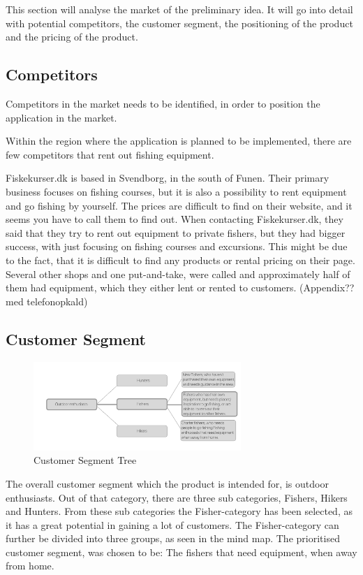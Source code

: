 This section will analyse the market of the preliminary idea. It will go into detail with potential competitors, the customer segment, the positioning of the product and the pricing of the product.

\subsection{Competitors}
Competitors in the market needs to be identified, in order to position the application in the market.

Within the region where the application is planned to be implemented, there are few competitors that rent out fishing equipment. 

Fiskekurser.dk is based in Svendborg, in the south of Funen. Their primary business focuses on fishing courses, but it is also a possibility to rent equipment and go fishing by yourself.
The prices are difficult to find on their website, and it seems you have to call them to find out.
When contacting Fiskekurser.dk, they said that they try to rent out equipment to private fishers, but they had bigger success, with just focusing on fishing courses and excursions. This might be due to the fact, that it is difficult to find any products or rental pricing on their page.
Several other shops and one put-and-take, were called and approximately half of them had equipment, which they either lent or rented to customers. (Appendix?? med telefonopkald)

\subsection{Customer Segment}
\begin{figure}[t!]
  \centering
  \includegraphics[width=0.7\textwidth]{images/SegmentTree}
  \caption{Customer Segment Tree}
\end{figure}



The overall customer segment  which the product is intended for, is outdoor enthusiasts. Out of that category, there are three sub categories, Fishers, Hikers and Hunters. From these sub categories the Fisher-category has been selected, as it has a great potential in gaining a lot of customers. The Fisher-category can further be divided into three groups, as seen in the mind map. The prioritised customer segment, was chosen to be: The fishers that need equipment, when away from home.  

